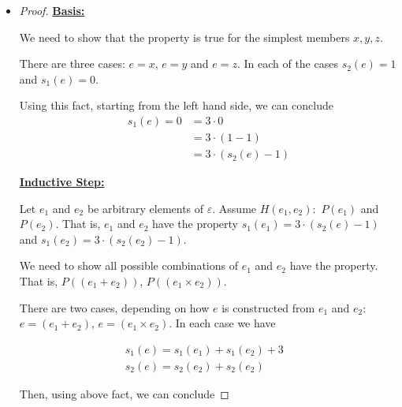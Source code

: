 \documentclass[12pt]{article}
\begin{document}
\begin{itemize}
    \item

    \begin{proof}
        \underline{\textbf{Basis:}}

        \bigskip

        We need to show that the property is true for the simplest members $x,y,z$.

        \bigskip

        There are three cases: $e = x$, $e = y$ and $e = z$. In each of the cases
        $s_2(e) = 1$ and $s_1(e) = 0$.

        \bigskip

        Using this fact, starting from the left hand side, we can conclude
        \setcounter{equation}{0}
        \begin{align}
            s_1(e) = 0 &= 3 \cdot 0\\
            &= 3 \cdot (1 - 1)\\
            &= 3 \cdot (s_2(e) - 1)
        \end{align}

        \bigskip

        \underline{\textbf{Inductive Step:}}

        \bigskip

        Let $e_1$ and $e_2$ be arbitrary elements of $\varepsilon$.
        Assume $H({e_1,e_2}):$ $P(e_1)$ and $P(e_2)$. That is, $e_1$ and $e_2$
        have the property $s_1(e_1) = 3 \cdot (s_2(e) - 1)$ and
        $s_1(e_2) = 3 \cdot (s_2(e_2) - 1)$.

        \bigskip

        We need to show all possible combinations of $e_1$ and $e_2$ have the
        property. That is, $P((e_1 + e_2))$, $P((e_1 \times e_2))$.

        \bigskip

        There are two cases, depending on how $e$ is constructed from $e_1$ and $e_2$:
        $e = (e_1 + e_2)$, $e = (e_1 \times e_2)$.
        In each case we have

        \begin{align}
            s_1(e) = s_1(e_1) + s_1(e_2) + 3 & \\
            s_2(e) = s_2(e_2) + s_2(e_2)
        \end{align}

        \bigskip

        Then, using above fact, we can conclude


\end{proof}
\end{itemize}
\end{document}
